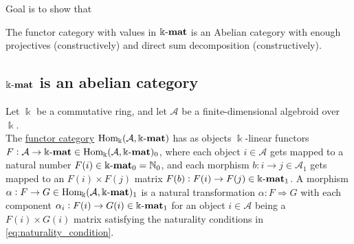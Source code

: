 \label{sect:abelian_cat}
Goal is to show that

The functor category with values in $\Bbbk\textnormal{-}\mathbf{mat}$ is an Abelian category with enough projectives (constructively) and direct sum decomposition (constructively).

\subsection{$\Bbbk\textnormal{-}\mathbf{mat}$ is an abelian category}

\begin{definition}
Let $\Bbbk$ be a commutative ring, and let $\mathcal{A}$ be a finite-dimensional algebroid over $\Bbbk$.\\
The \ul{functor category} $\mathrm{Hom_{\Bbbk}}(\mathcal{A},\Bbbk\textnormal{-}\mathbf{mat})$ has as objects $\Bbbk$-linear functors $F : \mathcal{A} \rightarrow \Bbbk\textnormal{-}\mathbf{mat} \in \mathrm{Hom_{\Bbbk}}(\mathcal{A},\Bbbk\textnormal{-}\mathbf{mat})_{0}$, where each
object $i \in \mathcal{A}$ gets mapped to a natural number $F(i) \in \Bbbk\textnormal{-}\mathbf{mat}_{0} = \mathbb{N}_{0}$, and each
morphism $b : i \rightarrow j \in \mathcal{A}_{1}$ gets mapped to an $F(i) \times F(j)$ matrix $F(b) : F(i) \rightarrow F(j) \in \Bbbk\textnormal{-}\mathbf{mat}_{1}$.
A morphism $\alpha : F \rightarrow G \in \mathrm{Hom_{\Bbbk}}(\mathcal{A},\Bbbk\textnormal{-}\mathbf{mat})_{1}$ is a natural transformation $\alpha : F \Rightarrow G$ with each component
$\alpha_{i} : F(i) \rightarrow G(i) \in \Bbbk\textnormal{-}\mathbf{mat}_{1}$ for an object $i \in \mathcal{A}$ being a $F(i) \times G(i)$ matrix satisfying the
naturality conditions in \eqref{eq:naturality_condition}.
\end{definition}

